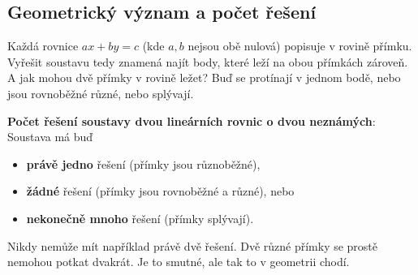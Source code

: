\subsection{Geometrický význam a počet řešení}\label{sec:soustavy-pocet-reseni}

Každá rovnice $ax + by = c$ (kde $a, b$ nejsou obě nulová) popisuje v rovině přímku. Vyřešit soustavu tedy znamená najít body, které leží na obou přímkách zároveň. A jak mohou dvě přímky v rovině ležet? Buď se protínají v jednom bodě, nebo jsou rovnoběžné různé, nebo splývají.

\begin{center}
\end{center}

\begin{definitionbox}
  \textbf{Počet řešení soustavy dvou lineárních rovnic o dvou neznámých}: Soustava má buď
  \begin{itemize}
    \item \textbf{právě jedno} řešení (přímky jsou různoběžné),
    \item \textbf{žádné} řešení (přímky jsou rovnoběžné a různé), nebo
    \item \textbf{nekonečně mnoho} řešení (přímky splývají).
  \end{itemize}
  Nikdy nemůže mít například právě dvě řešení. Dvě různé přímky se prostě nemohou potkat dvakrát. Je to smutné, ale tak to v geometrii chodí.
\end{definitionbox}

